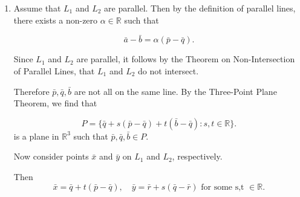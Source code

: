 \begin{proofbox}

  \begin{enumerate}[label=(\arabic*), series = ParLinProof]
    \item Assume that \(L_1\) and \(L_2\) are parallel. Then by the definition of parallel lines, there exists a non-zero \(\alpha \in \mathbb{R}\) such that

    \[
      \bar{a} - \bar{b} = \alpha(\bar{p} - \bar{q}).
    \]

    Since \(L_1\) and \(L_2\) are parallel, it follows by the Theorem on Non-Intersection of Parallel Lines, that \(L_1\) and \(L_2\) do not intersect.

    Therefore \(\bar{p},\bar{q}, \bar{b}\) are not all on the same line. By the Three-Point Plane Theorem, we find that

    \[
      P = \{\bar{q} + s(\bar{p} - \bar{q}) + t(\bar{b} - \bar{q}) : s, t \in \mathbb{R}\}.
    \]
    is a plane in \(\mathbb{R}^3\) such that \(\bar{p}, \bar{q}, \bar{b} \in P\).

    Now consider points \(\bar{x}\) and \(\bar{y}\) on \(L_1\) and \(L_2\), respectively.

    Then
    \[
      \bar{x} = \bar{q} + t(\bar{p} - \bar{q}), \quad
      \bar{y} = \bar{r} + s(\bar{q} - \bar{r}) \text{ for some s,t } \in \mathbb{R}.
    \]


  \end{enumerate}
\end{proofbox}